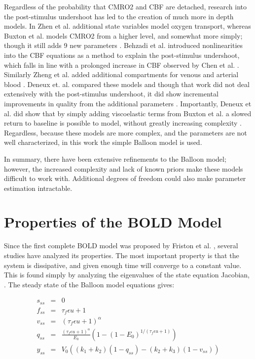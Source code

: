Regardless of the probability that \ac{CMRO2} and \ac{CBF} are detached,
research into the post-stimulus undershoot has led to the creation
of much more in depth models. In Zhen et al. additional state
variables model oxygen transport, whereas Buxton et al. models
\ac{CMRO2} from a higher level, and somewhat more simply; though it 
still adds 9 new parameters \cite{Zheng2002, Buxton2004}. Behzadi et al. 
introduced nonlinearities into the \ac{CBF} equations as a method to
explain the post-stimulus undershoot, which falls in line with a 
prolonged increase in \ac{CBF} observed by Chen et al. \cite{Behzadi2005, Chen2009}. 
Similarly Zheng et al. added additional compartments for 
venous and arterial blood \cite{Zheng2005}. 
Deneux et. al. compared these models and though 
that work did not deal extensively with the 
post-stimulus undershoot, it did show incremental improvements
in quality from the additional parameters \cite{Deneux2006}.  
Importantly, Deneux et al. did show that by 
simply adding viscoelastic terms from Buxton et al. a slowed return 
to baseline is possible to model, without greatly increasing
complexity \cite{Deneux2006, Buxton2004}. Regardless, because these models are more 
complex, and the parameters are not well characterized, in this work the simple
Balloon model is used. 

In summary, there have been extensive refinements to the Balloon
model; however, the increased complexity and lack of known priors 
make these models difficult to work with. Additional degrees of freedom 
could also make parameter estimation intractable.

\section{Properties of the \ac{BOLD} Model}
\label{sec:BOLD Analysis}
Since the first complete \ac{BOLD} model was proposed by Friston et al. 
\cite{Friston2000},  
several studies have analyzed its properties.  
The most important property is that the system is dissipative, and given
enough time will converge to a constant value. This is found simply by
analyzing the eigenvalues of the state equation Jacobian, 
\cite{Deneux2006, Hu2009}. The steady state of the Balloon
model equations gives:

\begin{eqnarray}
s_{ss} &=& 0 \nonumber \\
f_{ss} &=& \tau_f\epsilon u + 1\nonumber \\
v_{ss} &=& (\tau_f\epsilon u + 1)^\alpha\nonumber \\
q_{ss} &=& \frac{(\tau_f\epsilon u + 1)^\alpha}{E_0}(1-(1-E_0)^{1/(\tau_f\epsilon u + 1)})\nonumber \\
y_{ss} &=& V_0((k_1+k_2)(1-q_{ss}) - (k_2+k_3)(1-v_{ss}))
\label{eq:steadystate}
\end{eqnarray}

